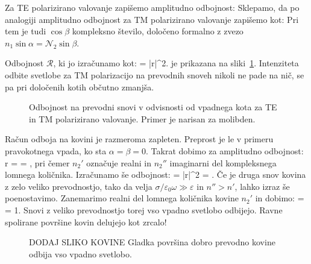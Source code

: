 Za TE polarizirano valovanje zapišemo amplitudno odbojnost:
Sklepamo, da po analogiji amplitudno odbojnost za TM polarizirano valovanje zapišemo kot: 
Pri tem je tudi $\cos \beta$ kompleksno število, določeno formalno 
z zvezo $n_1 \sin \alpha = \mathcal{N}_2 \sin \beta$.

Odbojnost $\mathcal{R}$, ki jo izračunamo kot:
\beq
{} = |r|^2.
\label{eq:04_100a}
\eeq
je prikazana na sliki~\ref{fig:04_kovina}. Intenziteta odbite svetlobe za TM polarizacijo 
na prevodnih snoveh nikoli ne pade na nič, se pa pri določenih kotih občutno
zmanjša. 
\begin{figure}[ht]
\centering
\def\svgwidth{60truemm} 

\caption{Odbojnost na prevodni snovi v odvisnosti od vpadnega kota za TE in TM polarizirano
valovanje. Primer je narisan za molibden.}
\label{fig:04_kovina}
\end{figure}

Račun odboja na kovini je razmeroma zapleten. Preprost je le v primeru pravokotnega vpada, 
ko sta $\alpha = \beta = 0$. Takrat dobimo za amplitudno odbojnost:
\beq
r =  = ,
\label{eq:04_101}
\eeq
pri čemer $n_2'$ označuje realni in $n_2''$ imaginarni del kompleksnega lomnega količnika.
Izračunamo še odbojnost:
\beq
{} = |r|^2 = .
\label{eq:04_102}
\eeq
Če je druga snov kovina z zelo veliko prevodnostjo, tako da velja $\sigma/\varepsilon_0 \omega \gg \varepsilon$
in $n''> n'$, lahko izraz še poenostavimo. Zanemarimo realni del lomnega količnika kovine $n_2'$
in dobimo:
\beq
{} =  = 1.
\label{eq:04_103}
\eeq
Snovi z veliko prevodnostjo torej vso vpadno svetlobo odbijejo. Ravne spolirane površine kovin
delujejo kot zrcalo!
\begin{figure}[ht]
\centering
\caption{DODAJ SLIKO KOVINE Gladka površina dobro prevodno kovine odbija vso vpadno svetlobo.}
\label{fig:04_KovinaFoto}
\end{figure}
